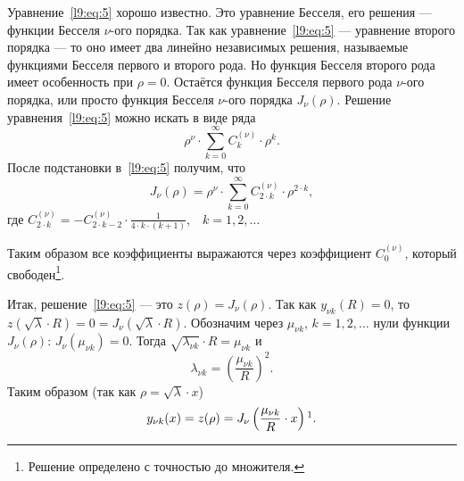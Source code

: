 Уравнение~\eqref{l9:eq:5} хорошо известно. Это уравнение Бесселя, его решения --- функции Бесселя $\nu$-ого порядка. Так как уравнение~\eqref{l9:eq:5} --- уравнение второго порядка --- то оно имеет два линейно независимых решения, называемые функциями Бесселя первого и второго рода. Но функция Бесселя второго рода имеет особенность при $\rho=0$. Остаётся функция Бесселя первого рода $\nu$-ого порядка, или просто функция Бесселя $\nu$-ого порядка $J_\nu(\rho)$. Решение уравнения~\eqref{l9:eq:5} можно искать в виде ряда
\begin{equation*}
	\rho^{\nu}\cdot\sum\limits_{k=0}^{\infty}C_k^{(\nu)}\cdot\rho^k.
\end{equation*}  
После подстановки в~\eqref{l9:eq:5} получим, что 
\begin{equation}\label{l9:eq:6}
	 J_{\nu}(\rho)=\rho^{\nu}\cdot\sum\limits_{k=0}^{\infty}C_{2\cdot k}^{(\nu)}\cdot\rho^{2\cdot k},
\end{equation}
где $\displaystyle C_{2\cdot k}^{(\nu)}=-C_{2\cdot k-2}^{(\nu)}\cdot\frac{1}{4\cdot k\cdot(k+1)}$,$\quad k=1,2,\ldots$

\noindent Таким образом все коэффициенты выражаются через коэффициент $C_0^{(\nu)}$, который свободен\footnote{Решение определено с точностью до множителя.}.

Итак, решение~\eqref{l9:eq:5} --- это $z(\rho)=J_{\nu}(\rho)$. Так как $y_{\nu k}(R)=0$, то $z(\sqrt{\lambda}\cdot R)=0=J_{\nu}\left(\sqrt{\lambda}\cdot R\right)$. Обозначим через $\mu_{\nu k}$, $k=1,2,\ldots$ нули функции $J_{\nu}(\rho):\,J_{\nu}\left(\mu_{\nu k}\right)=0$. Тогда $\sqrt{\lambda_{\nu k}}\cdot R=\mu_{\nu k}$ и 
\begin{equation}\label{l9:eq:7}
	\lambda_{\nu k}=\left(\frac{\mu_{\nu k}}{R}\right)^2.
\end{equation}
Таким образом (так как $\rho=\sqrt{\lambda}\cdot x$)
\begin{equation}\label{l9:eq:8}
	 y_{\nu k}(x)=z(\rho)=J_{\nu}\left(\frac{\mu_{\nu k}}{R}\cdot x\right)\footnotemark{}.
\end{equation}

